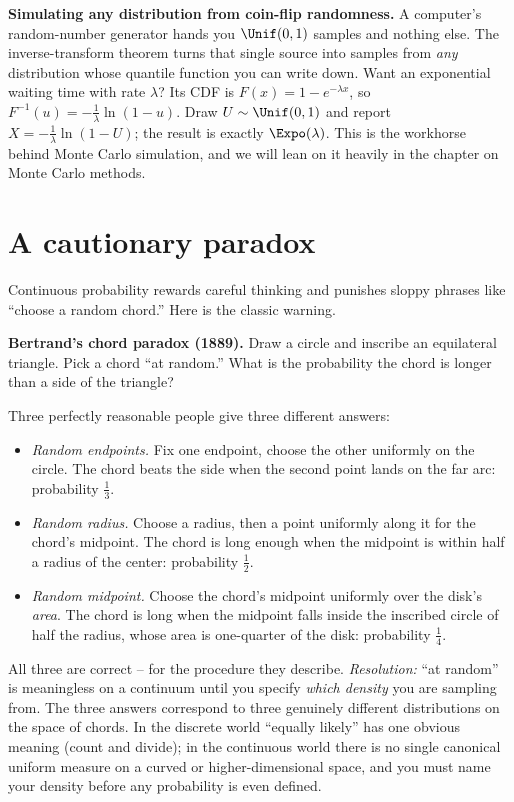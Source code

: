 \begin{applicationbox}
\textbf{Simulating any distribution from coin-flip randomness.} A computer's
random-number generator hands you $\Unif(0,1)$ samples and nothing else. The
inverse-transform theorem turns that single source into samples from \emph{any}
distribution whose quantile function you can write down. Want an exponential waiting
time with rate $\lambda$? Its CDF is $F(x)=1-e^{-\lambda x}$, so
$F^{-1}(u) = -\tfrac{1}{\lambda}\ln(1-u)$. Draw $U\sim\Unif(0,1)$ and report
$X = -\tfrac{1}{\lambda}\ln(1-U)$; the result is exactly $\Expo(\lambda)$. This is
the workhorse behind Monte Carlo simulation, and we will lean on it heavily in the
chapter on Monte Carlo methods.
\end{applicationbox}

\section{A cautionary paradox}
\label{ch10:paradox}

Continuous probability rewards careful thinking and punishes sloppy phrases like
``choose a random chord.'' Here is the classic warning.

\begin{paradoxbox}
\textbf{Bertrand's chord paradox (1889).} Draw a circle and inscribe an equilateral
triangle. Pick a chord ``at random.'' What is the probability the chord is longer
than a side of the triangle?

Three perfectly reasonable people give three different answers:
\begin{itemize}
\item \emph{Random endpoints.} Fix one endpoint, choose the other uniformly on the
      circle. The chord beats the side when the second point lands on the far arc:
      probability $\tfrac{1}{3}$.
\item \emph{Random radius.} Choose a radius, then a point uniformly along it for the
      chord's midpoint. The chord is long enough when the midpoint is within half a
      radius of the center: probability $\tfrac{1}{2}$.
\item \emph{Random midpoint.} Choose the chord's midpoint uniformly over the disk's
      \emph{area}. The chord is long when the midpoint falls inside the inscribed
      circle of half the radius, whose area is one-quarter of the disk: probability
      $\tfrac{1}{4}$.
\end{itemize}
All three are correct -- for the procedure they describe. \emph{Resolution:} ``at
random'' is meaningless on a continuum until you specify \emph{which density} you are
sampling from. The three answers correspond to three genuinely different
distributions on the space of chords. In the discrete world ``equally likely'' has
one obvious meaning (count and divide); in the continuous world there is no single
canonical uniform measure on a curved or higher-dimensional space, and you must name
your density before any probability is even defined.
\end{paradoxbox}


